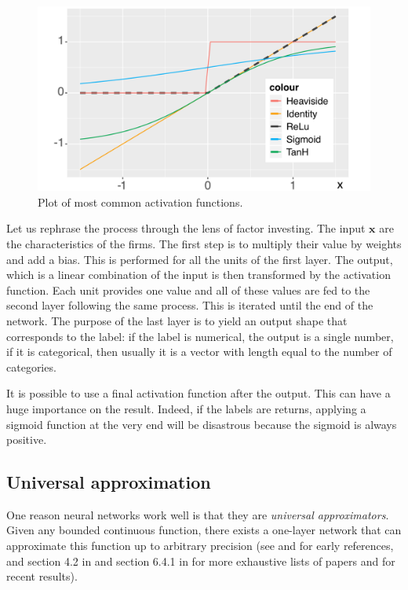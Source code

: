 \documentclass[]{krantz}
\theoremstyle{definition}
\theoremstyle{definition}
\theoremstyle{definition}
\theoremstyle{remark}
\begin{document}
\begin{figure}[H]

{\centering \includegraphics[width=11.81in]{images/activation} 

}

\caption{Plot of most common activation functions.}\label{fig:activationf}
\end{figure}

Let us rephrase the process through the lens of factor investing. The
input \(\textbf{x}\) are the characteristics of the firms. The first
step is to multiply their value by weights and add a bias. This is
performed for all the units of the first layer. The output, which is a
linear combination of the input is then transformed by the activation
function. Each unit provides one value and all of these values are fed
to the second layer following the same process. This is iterated until
the end of the network. The purpose of the last layer is to yield an
output shape that corresponds to the label: if the label is numerical,
the output is a single number, if it is categorical, then usually it is
a vector with length equal to the number of categories.

It is possible to use a final activation function after the output. This
can have a huge importance on the result. Indeed, if the labels are
returns, applying a sigmoid function at the very end will be disastrous
because the sigmoid is always positive.

\hypertarget{universal-approximation}{%
\subsection{Universal approximation}\label{universal-approximation}}

One reason neural networks work well is that they are
\textit{universal approximators}. Given any bounded continuous function,
there exists a one-layer network that can approximate this function up
to arbitrary precision (see \citet{cybenko1989approximation} and for
early references, and section 4.2 in \citet{du2013neural} and section
6.4.1 in \citet{goodfellow2016deep} for more exhaustive lists of papers
and \citet{guliyev2018approximation} for recent results).
\end{document}
